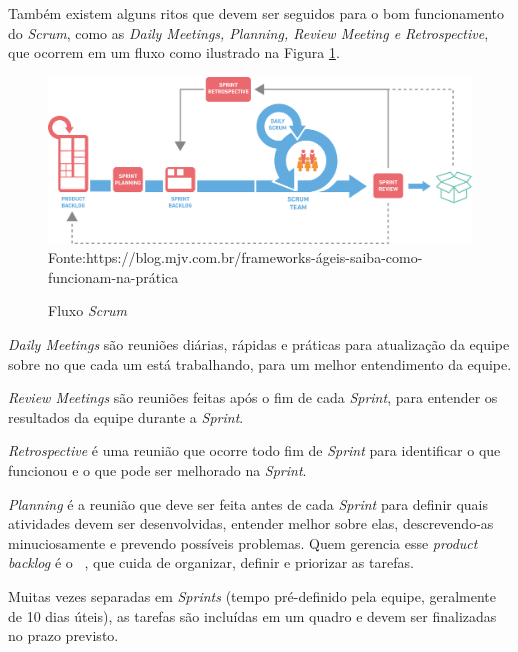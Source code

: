 Também existem alguns ritos que devem ser seguidos para o bom funcionamento do \textit{Scrum}, como as \textit{Daily Meetings, Planning, Review Meeting e Retrospective}, que ocorrem em um fluxo como ilustrado na Figura \ref{fig:scrum}.

\begin{figure}[H]
\centering
\caption{Fluxo \textit{Scrum}} %
\includegraphics[scale=0.15]{Scrum}\\  %
{\small Fonte:https://blog.mjv.com.br/frameworks-ágeis-saiba-como-funcionam-na-prática} %
\label{fig:scrum} %
\end{figure}

\textit{Daily Meetings} são reuniões diárias, rápidas e práticas para atualização da equipe sobre no que cada um está trabalhando, para um melhor entendimento da equipe.

\textit{Review Meetings} são reuniões feitas após o fim de cada \textit{Sprint}, para entender os resultados da equipe durante a \textit{Sprint}.

\textit{Retrospective} é uma reunião que ocorre todo fim de \textit{Sprint} para identificar o que funcionou e o que pode ser melhorado na \textit{Sprint}.

\textit{Planning} é a reunião que deve ser feita antes de cada \textit{Sprint} para definir quais atividades devem ser desenvolvidas, entender melhor sobre elas, descrevendo-as minuciosamente e prevendo possíveis problemas.
Quem gerencia esse \textit{product backlog} é o  ~, que cuida de organizar, definir e priorizar as tarefas.

Muitas vezes separadas em \textit{Sprints} (tempo pré-definido pela equipe, geralmente de 10 dias úteis), as tarefas são incluídas em um quadro e devem ser finalizadas no prazo previsto.


